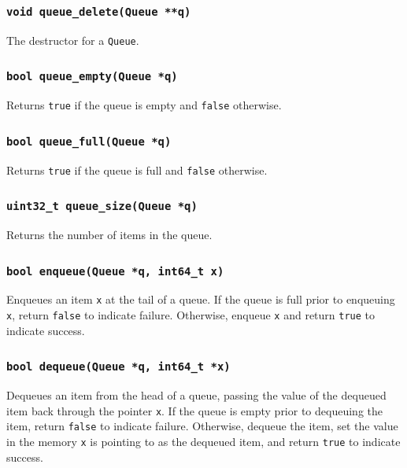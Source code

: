 \documentclass[11pt]{article}
\begin{document}
\subsubsection{\texttt{void queue\_delete(Queue **q)}}

The destructor for a \texttt{Queue}.

\subsubsection{\texttt{bool queue\_empty(Queue *q)}}

Returns \texttt{true} if the queue is empty and \texttt{false}
otherwise.

\subsubsection{\texttt{bool queue\_full(Queue *q)}}

Returns \texttt{true} if the queue is full and \texttt{false} otherwise.

\subsubsection{\texttt{uint32\_t queue\_size(Queue *q)}}

Returns the number of items in the queue.

\subsubsection{\texttt{bool enqueue(Queue *q, int64\_t x)}}

Enqueues an item \texttt{x} at the tail of a queue. If the queue is full prior to
enqueuing \texttt{x}, return \texttt{false} to indicate failure.
Otherwise, enqueue \texttt{x} and return \texttt{true} to indicate
success.

\subsubsection{\texttt{bool dequeue(Queue *q, int64\_t *x)}}

Dequeues an item from the head of a queue, passing the value of the
dequeued item back through the pointer \texttt{x}. If the queue is
empty prior to dequeuing the item, return \texttt{false} to indicate
failure. Otherwise, dequeue the item, set the value in the memory
\texttt{x} is pointing to as the dequeued item, and return \texttt{true}
to indicate success.
\end{document}
